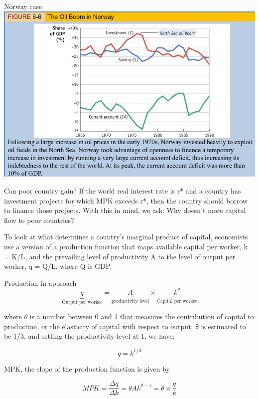 \documentclass[
  ignorenonframetext,
]{beamer}
\begin{document}
\begin{frame}{Norway case}
\label{norway-case}
\includegraphics{Picture2.png}
\end{frame}

\begin{frame}{Can poor country gain?}
\label{can-poor-country-gain}
If the world real interest rate is r* and a country has investment
projects for which MPK exceeds r*, then the country should borrow to
finance those projects. With this in mind, we ask: Why doesn't more
capital flow to poor countries?

To look at what determines a country's marginal product of capital,
economists use a version of a production function that maps available
capital per worker, k = K/L, and the prevailing level of productivity A
to the level of output per worker, q = Q/L, where Q is GDP.
\end{frame}

\begin{frame}{Production fn approach}
\label{production-fn-approach}
\[
\underbrace{q}_{\text{Output per worker}}=\underbrace{A}_{\text{productivity level}} \times \underbrace{k^\theta}_{\text{Capital per worker}}
\]

where \(\theta\) is a number between 0 and 1 that measures the
contribution of capital to production, or the elasticity of capital with
respect to output. θ is estimated to be 1/3, and setting the
productivity level at 1, we have:

\[
q=k^{1/3}
\]

MPK, the slope of the production function is given by

\[
MPK=\frac{\Delta q}{\Delta k}=\theta Ak^{\theta-1}=\theta \times \frac{q}{k}
\]
\end{frame}
\end{document}

